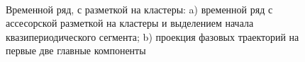 \documentclass[12pt, twoside]{article}
\numberwithin{equation}{section}
\begin{document}
\begin{figure}[h!t]\center
{}
\\
\caption{Временной ряд, с разметкой на кластеры: a) временной ряд с ассесорской разметкой на кластеры и выделением начала квазипериодического сегмента; b) проекция фазовых траекторий на первые две главные компоненты }
\end{figure}
\end{document}

